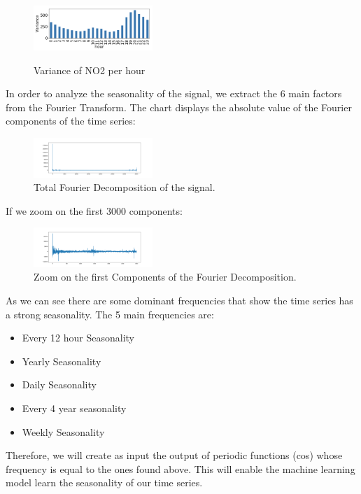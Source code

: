 \documentclass[a4paper,twocolumn,5p]{elsarticle}
\begin{document}
\begin{figure}
  \caption{Variance of NO2 per hour}
  \centering
      \includegraphics[width=0.4\textwidth]{variance}
\label{figure:variance}
\end{figure}

In order to analyze the seasonality of the signal, we extract the 6 main factors 
from the Fourier Transform. The chart displays the absolute value of
the Fourier components of the time series:

\begin{figure}
  \caption{Total Fourier Decomposition of the signal.}
  \centering
  \includegraphics[width=0.4\textwidth]{decomposition}
\end{figure}

If we zoom on the first 3000 components:

\begin{figure}
  \caption{Zoom on the first Components of the Fourier Decomposition.}
  \centering
  \includegraphics[width=0.4\textwidth]{decompositionzoom}
\end{figure}

As we can see there are some dominant frequencies that show the time series has a 
strong seasonality. The 5 main frequencies are:

\begin{itemize}
  \item Every 12 hour Seasonality
  \item Yearly Seasonality
  \item Daily Seasonality
  \item Every 4 year seasonality
  \item Weekly Seasonality
\end{itemize} 

Therefore, we will create as input the output of periodic functions (cos) whose frequency is equal to the ones found 
above. This will enable the machine learning model learn the seasonality of our time series.
\end{document}
